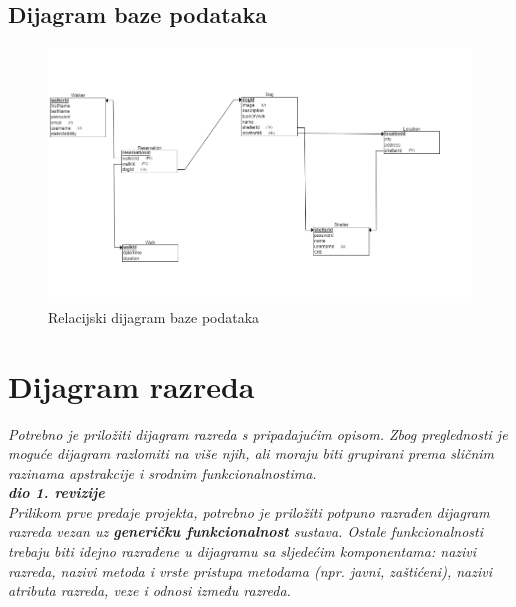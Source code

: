 			
			\subsection{Dijagram baze podataka}
				
				\vspace{15pt} 
				\begin{figure}[H]
					\includegraphics[scale=0.9]{dijagrami/relacijski.PNG} %
					\centering
					\caption{Relacijski dijagram baze podataka}
					\label{fig:relacijski}
				\end{figure}
				\vspace{15pt}
			
			\eject
			
			
		\section{Dijagram razreda}
		
		\iffalse
			\textit{Potrebno je priložiti dijagram razreda s pripadajućim opisom. Zbog preglednosti je moguće dijagram razlomiti na više njih, ali moraju biti grupirani prema sličnim razinama apstrakcije i srodnim funkcionalnostima.}\\
			
			\textbf{\textit{dio 1. revizije}}\\
			
			\textit{Prilikom prve predaje projekta, potrebno je priložiti potpuno razrađen dijagram razreda vezan uz \textbf{generičku funkcionalnost} sustava. Ostale funkcionalnosti trebaju biti idejno razrađene u dijagramu sa sljedećim komponentama: nazivi razreda, nazivi metoda i vrste pristupa metodama (npr. javni, zaštićeni), nazivi atributa razreda, veze i odnosi između razreda.}\\
			
